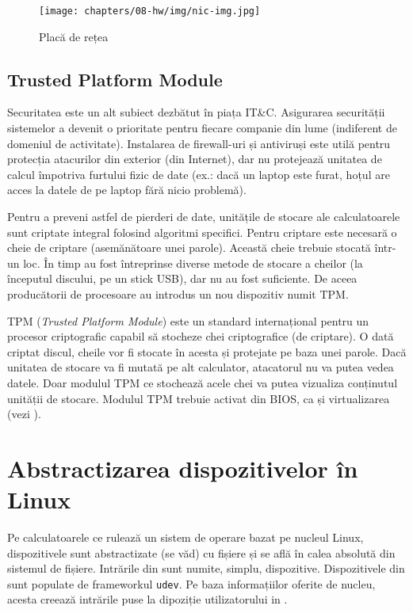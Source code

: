 \begin{figure}[!htbp]
  \centering
  \texttt{[image: chapters/08-hw/img/nic-img.jpg]}
  \caption{Placă de rețea\protect\footnotemark}
  \label{fig:hw:nic}
\end{figure}

\subsection{Trusted Platform Module}
\label{sec:hw:features:tpm}

Securitatea este un alt subiect dezbătut în piața IT\&C. Asigurarea
securității sistemelor a devenit o prioritate pentru fiecare companie din lume
(indiferent de domeniul de activitate). Instalarea de firewall-uri și antiviruși
este utilă pentru protecția atacurilor din exterior (din Internet), dar nu
protejează unitatea de calcul împotriva furtului fizic de date (ex.: dacă un
laptop este furat, hoțul are acces la datele de pe laptop fără nicio problemă).

Pentru a preveni astfel de pierderi de date, unitățile de stocare ale
calculatoarele sunt criptate integral folosind algoritmi specifici. Pentru
criptare este necesară o cheie de criptare (asemănătoare unei parole). Această
cheie trebuie stocată într-un loc. În timp au fost întreprinse diverse metode de
stocare a cheilor (la începutul discului, pe un stick USB), dar nu au fost
suficiente. De aceea producătorii de procesoare au introdus un nou dispozitiv
numit TPM.

TPM (\textit{Trusted Platform Module}) este un standard internațional
pentru un procesor criptografic capabil să stocheze chei criptografice (de
criptare). O dată criptat discul, cheile vor fi stocate în acesta și protejate
pe baza unei parole. Dacă unitatea de stocare va fi mutată pe alt calculator,
atacatorul nu va putea vedea datele. Doar modulul TPM ce stochează acele chei va
putea vizualiza conținutul unității de stocare. Modulul TPM trebuie activat din
BIOS, ca și virtualizarea (vezi ).

\section{Abstractizarea dispozitivelor în Linux}
\label{sec:hw:abstraction}

Pe calculatoarele ce rulează un sistem de operare bazat pe nucleul Linux,
dispozitivele sunt abstractizate (se văd) cu fișiere și se află în calea
absolută  din sistemul de fișiere. Intrările din  sunt numite, simplu, dispozitive. Dispozitivele din  sunt populate de
frameworkul \texttt{udev}. Pe baza informațiilor
oferite de nucleu, acesta creează intrările puse la dipoziție utilizatorului in
.

